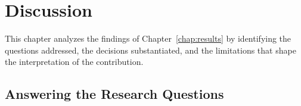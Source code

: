 
\chapter{Discussion}\label{chap:discussion}

This chapter analyzes the findings of Chapter~\ref{chap:results} by identifying the questions addressed, the decisions substantiated, and the limitations that shape the interpretation of the contribution.

\section{Answering the Research Questions}\label{sec:answering-rqs}


